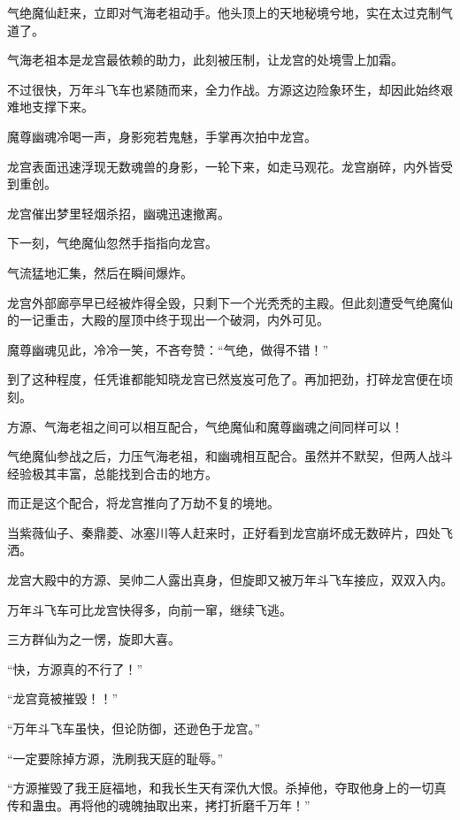 
\begin{this_body}

气绝魔仙赶来，立即对气海老祖动手。他头顶上的天地秘境兮地，实在太过克制气道了。

气海老祖本是龙宫最依赖的助力，此刻被压制，让龙宫的处境雪上加霜。

不过很快，万年斗飞车也紧随而来，全力作战。方源这边险象环生，却因此始终艰难地支撑下来。

魔尊幽魂冷喝一声，身影宛若鬼魅，手掌再次拍中龙宫。

龙宫表面迅速浮现无数魂兽的身影，一轮下来，如走马观花。龙宫崩碎，内外皆受到重创。

龙宫催出梦里轻烟杀招，幽魂迅速撤离。

下一刻，气绝魔仙忽然手指指向龙宫。

气流猛地汇集，然后在瞬间爆炸。

龙宫外部廊亭早已经被炸得全毁，只剩下一个光秃秃的主殿。但此刻遭受气绝魔仙的一记重击，大殿的屋顶中终于现出一个破洞，内外可见。

魔尊幽魂见此，冷冷一笑，不吝夸赞：“气绝，做得不错！”

到了这种程度，任凭谁都能知晓龙宫已然岌岌可危了。再加把劲，打碎龙宫便在顷刻。

方源、气海老祖之间可以相互配合，气绝魔仙和魔尊幽魂之间同样可以！

气绝魔仙参战之后，力压气海老祖，和幽魂相互配合。虽然并不默契，但两人战斗经验极其丰富，总能找到合击的地方。

而正是这个配合，将龙宫推向了万劫不复的境地。

当紫薇仙子、秦鼎菱、冰塞川等人赶来时，正好看到龙宫崩坏成无数碎片，四处飞洒。

龙宫大殿中的方源、吴帅二人露出真身，但旋即又被万年斗飞车接应，双双入内。

万年斗飞车可比龙宫快得多，向前一窜，继续飞逃。

三方群仙为之一愣，旋即大喜。

“快，方源真的不行了！”

“龙宫竟被摧毁！！”

“万年斗飞车虽快，但论防御，还逊色于龙宫。”

“一定要除掉方源，洗刷我天庭的耻辱。”

“方源摧毁了我王庭福地，和我长生天有深仇大恨。杀掉他，夺取他身上的一切真传和蛊虫。再将他的魂魄抽取出来，拷打折磨千万年！”


\end{this_body}
